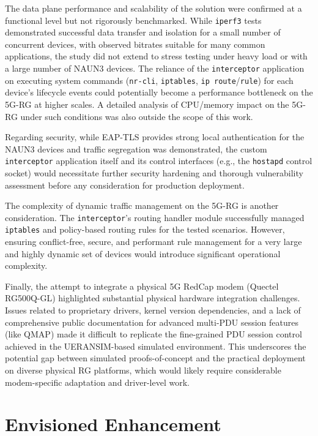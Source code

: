 The data plane performance and scalability of the solution were confirmed at a functional level but not rigorously benchmarked. While \texttt{iperf3} tests demonstrated successful data transfer and isolation for a small number of concurrent devices, with observed bitrates suitable for many common applications, the study did not extend to stress testing under heavy load or with a large number of \ac{NAUN3} devices. The reliance of the \texttt{interceptor} application on executing system commands (\texttt{nr-cli}, \texttt{iptables}, \texttt{ip route}/\texttt{rule}) for each device's lifecycle events could potentially become a performance bottleneck on the \ac{5G-RG} at higher scales. A detailed analysis of \ac{CPU}/memory impact on the \ac{5G-RG} under such conditions was also outside the scope of this work.

Regarding security, while \ac{EAP-TLS} provides strong local authentication for the \ac{NAUN3} devices and traffic segregation was demonstrated, the custom \texttt{interceptor} application itself and its control interfaces (e.g., the \texttt{hostapd} control socket) would necessitate further security hardening and thorough vulnerability assessment before any consideration for production deployment.

The complexity of dynamic traffic management on the \ac{5G-RG} is another consideration. The \texttt{interceptor}'s routing handler module successfully managed \texttt{iptables} and policy-based routing rules for the tested scenarios. However, ensuring conflict-free, secure, and performant rule management for a very large and highly dynamic set of devices would introduce significant operational complexity.

Finally, the attempt to integrate a physical \ac{5G} RedCap modem (Quectel RG500Q-GL) highlighted substantial physical hardware integration challenges. Issues related to proprietary drivers, kernel version dependencies, and a lack of comprehensive public documentation for advanced multi-\ac{PDU} session features (like \ac{QMAP}) made it difficult to replicate the fine-grained \ac{PDU} session control achieved in the UERANSIM-based simulated environment. This underscores the potential gap between simulated proofs-of-concept and the practical deployment on diverse physical \ac{RG} platforms, which would likely require considerable modem-specific adaptation and driver-level work.

\section{Envisioned Enhancement}

